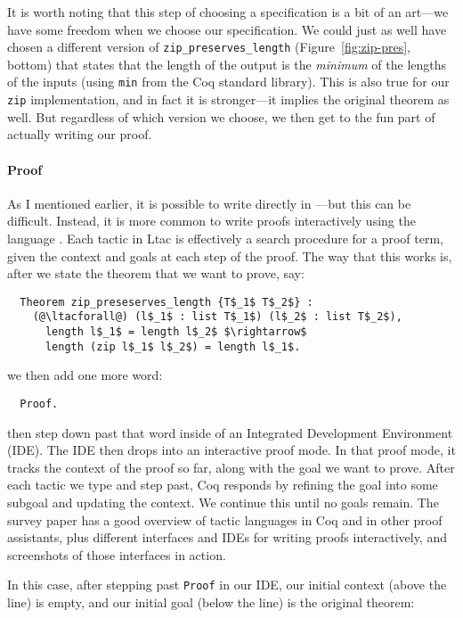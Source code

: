 It is worth noting that this step of choosing a specification is a bit of an art---we have some freedom when we choose our specification.
We could just as well have chosen a different version of \lstinline{zip_preserves_length} (Figure~\ref{fig:zip-pres}, bottom)
that states that the length of the output is the \textit{minimum} of the lengths of the inputs (using \lstinline{min} from the Coq standard library).
This is also true for our \lstinline{zip} implementation, and in fact it is stronger---it implies the original theorem as well.
But regardless of which version we choose, we then get to the fun part of actually writing our proof.

\paragraph{Proof} As I mentioned earlier, it is possible to write  directly in ---but this can be difficult.
Instead, it is more common to write proofs interactively using the  language .
Each tactic in Ltac is effectively a search procedure for a proof term, given the context and goals at each step of the proof.
The way that this works is, after we state the theorem that we want to prove, say:

\begin{lstlisting}
  Theorem zip_preseserves_length {T$_1$ T$_2$} :
    (@\ltacforall@) (l$_1$ : list T$_1$) (l$_2$ : list T$_2$),
      length l$_1$ = length l$_2$ $\rightarrow$
      length (zip l$_1$ l$_2$) = length l$_1$.
\end{lstlisting}
we then add one more word:

\begin{lstlisting}
  Proof.
\end{lstlisting}
then step down past that word inside of an Integrated Development Environment (IDE). %
The IDE then drops into an interactive proof mode.
In that proof mode, it tracks the context of the proof so far, along with the goal we want to prove.
After each tactic we type and step past, Coq responds by refining the goal into some subgoal
and updating the context.
We continue this until no goals remain.
The  survey paper has a good overview of tactic languages in Coq and in other proof assistants,
plus different interfaces and IDEs for writing proofs interactively, and screenshots of those interfaces in action.

In this case, after stepping past \lstinline{Proof} in our IDE, 
our initial context (above the line) is empty, and our initial goal (below the line) is the original theorem:

